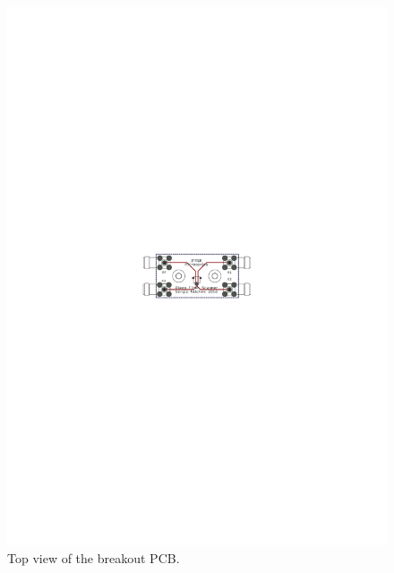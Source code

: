 \begin{figure}[h!]\centering \includegraphics[width=16cm]{appendix/pcb.pdf}
      \caption{Top view of the breakout PCB.}
\end{figure}
